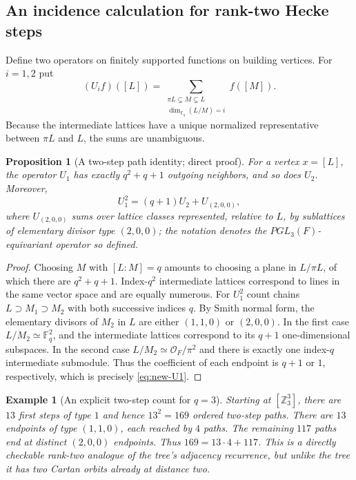 \documentclass[12pt,letterpaper]{amsart}
\numberwithin{equation}{section}
\newtheorem{proposition}[theorem]{Proposition}
\newtheorem{example}[theorem]{Example}
\theoremstyle{definition}
\theoremstyle{plain}
\begin{document}
\subsection{An incidence calculation for rank-two Hecke steps}
Define two operators on finitely supported functions on building
vertices. For $i=1,2$ put
\[
 (U_if)([L])=
 \sum_{\substack{\pi L\subsetneq M\subsetneq L\\
             \dim_{\mathbb F_q}(L/M)=i}}
 f([M]).
\]
Because the intermediate lattices have a unique normalized
representative between $\pi L$ and $L$, the sums are unambiguous.

\begin{proposition}[A two-step path identity; direct proof]
\label{prop:new-U1}
For a vertex $x=[L]$, the operator $U_1$ has exactly
$q^2+q+1$ outgoing neighbors, and so does $U_2$. Moreover,
\begin{equation}\label{eq:new-U1}
 U_1^2=(q+1)U_2+U_{(2,0,0)},
\end{equation}
where $U_{(2,0,0)}$ sums over lattice classes represented,
relative to $L$, by sublattices of elementary divisor type
$(2,0,0)$; the notation denotes the $PGL_3(F)$-equivariant
operator so defined.
\end{proposition}
\begin{proof}
Choosing $M$ with $[L:M]=q$ amounts to choosing a plane in
$L/\pi L$, of which there are $q^2+q+1$. Index-$q^2$
intermediate lattices correspond to lines in the same vector
space and are equally numerous.
For $U_1^2$ count chains
$L\supset M_1\supset M_2$ with both successive indices $q$.
By Smith normal form, the elementary divisors of $M_2$ in $L$
are either $(1,1,0)$ or $(2,0,0)$. In the first case
$L/M_2\simeq\mathbb F_q^2$, and the intermediate lattices
correspond to its $q+1$ one-dimensional subspaces.
In the second case $L/M_2\simeq\mathcal O_F/\pi^2$ and there
is exactly one index-$q$ intermediate submodule. Thus the
coefficient of each endpoint is $q+1$ or $1$, respectively,
which is precisely \eqref{eq:new-U1}.
\end{proof}

\begin{example}[An explicit two-step count for $q=3$]
Starting at $[\mathbb Z_3^3]$, there are $13$ first steps of
type $1$ and hence $13^2=169$ ordered two-step paths.
There are $13$ endpoints of type $(1,1,0)$, each reached by
$4$ paths. The remaining $117$ paths end at distinct
$(2,0,0)$ endpoints. Thus $169=13\cdot4+117$.
This is a directly checkable rank-two analogue of the tree's
adjacency recurrence, but unlike the tree it has two Cartan
orbits already at distance two.
\end{example}
\end{document}
